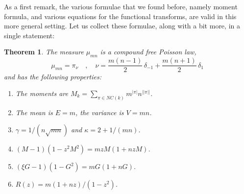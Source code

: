 \documentclass[12pt]{amsbook}
\newtheorem{theorem}{Theorem}[chapter]
\begin{document}
As a first remark, the various formulae that we found before, namely moment formula, and various equations for the functional transforms, are valid in this more general setting. Let us collect these formulae, along with a bit more, in a single statement:

\begin{theorem}
The measure $\mu_{mn}$ is a compound free Poisson law,
$$\mu_{mn}=\pi_\nu\quad,\quad\nu=\frac{m(n-1)}{2}\,\delta_{-1}+\frac{m(n+1)}{2}\,\delta_1$$
and has the following properties:
\begin{enumerate}
\item The moments are $M_k=\sum_{\pi\in NC(k)}m^{|\pi|}n^{||\pi||}$.

\item The mean is $E=m$, the variance is $V=mn$.

\item $\gamma=1/(n\sqrt{mn})$ and $\kappa=2+1/(mn)$.

\item $(M-1)(1-z^2M^2)=mzM(1+nzM)$.

\item $(\xi G-1)(1-G^2)=mG(1+nG)$.

\item $R(z)=m(1+nz)/(1-z^2)$.
\end{enumerate}
\end{theorem}
\end{document}
